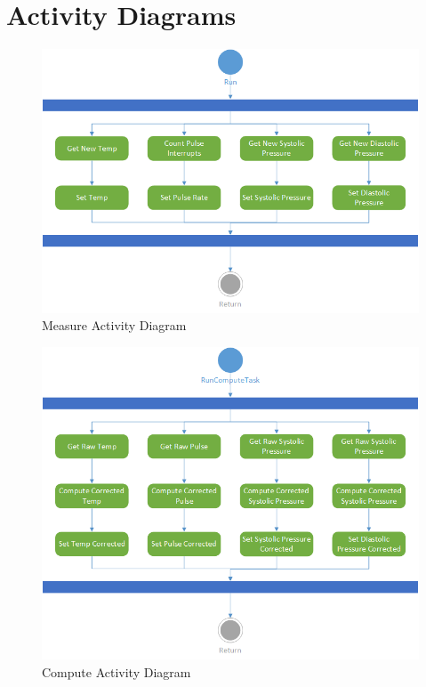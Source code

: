 \documentclass[12pt]{article} %
\begin{document}
    \section{Activity Diagrams}
		\label{appendix:activity_diagrams}

    \begin{figure}[H]
      \centering
      \includegraphics[width=\textwidth]{../design/measure_activity.png}
      \caption{Measure Activity Diagram}
      \label{fig:measureActivity}
    \end{figure}

    \begin{figure}[H]
      \centering
      \includegraphics[width=\textwidth]{../design/compute_activity.png}
      \caption{Compute Activity Diagram}
      \label{fig:computeActivity}
    \end{figure}
\end{document}
